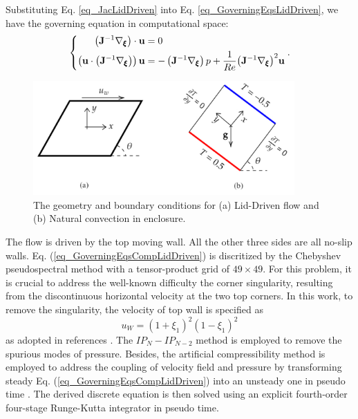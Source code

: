 \documentclass[preprint, 10pt]{elsarticle}
\begin{document}
Substituting Eq. \ref{eq_JacLidDriven} into Eq. \ref {eq_GoverningEqsLidDriven}, we have the governing equation in computational space:
\begin{equation}
\left \{
\begin{aligned}
\left(\mathbf{J}^{-1} \nabla_{\pmb {\xi}}\right)  \cdot {\bf{u}} &= 0 \\
\left( {{\bf{u}} \cdot \left(\mathbf{J}^{-1} \nabla_{\pmb {\xi}}\right) } \right){\bf{u}} &=  - \left(\mathbf{J}^{-1} \nabla_{\pmb {\xi}}\right) p + \frac{1}{Re}{\left(\mathbf{J}^{-1} \nabla_{\pmb {\xi}}\right) ^2}{\bf{u}}
\end{aligned}
\right .
.
\label{eq_GoverningEqsCompLidDriven}
\end{equation}


\begin{figure}[!ht]
    \centering
    \includegraphics[width=10cm]{..//fig/geometry.pdf}
    \caption{The geometry and boundary conditions for (a) Lid-Driven flow and (b) Natural convection in enclosure.}
    \label{fig_geometry}
\end{figure}


The flow is driven by the top moving wall. All the other three sides are all no-slip walls. Eq. (\ref{eq_GoverningEqsCompLidDriven}) is discritized by the Chebyshev pseudospectral method with a tensor-product grid of $49 \times 49$.
For this problem, it is crucial to address the well-known difficulty the corner singularity, resulting from the discontinuous horizontal velocity at the two top corners. In this work, to remove the singularity, the velocity of top wall is specified as
\begin{equation}
u_W = (1+\xi_1)^2(1-\xi_1)^2
\end{equation}
as adopted in references \cite{shen1991hopf, pinelli1994chebyshev, phillips1993treatment}. The $IP_{N}-IP_{N-2}$ method \cite{zhang2010explicit, peyret2013spectral} is employed to remove the spurious modes of pressure.
Besides, the artificial compressibility method \cite{clausen2013entropically} is employed to address the coupling  of velocity field and pressure by  transforming steady  Eq. (\ref{eq_GoverningEqsCompLidDriven}) into an unsteady one in pseudo time . The derived discrete equation is then solved using an explicit fourth-order four-stage Runge-Kutta integrator in pseudo time.
\end{document}
